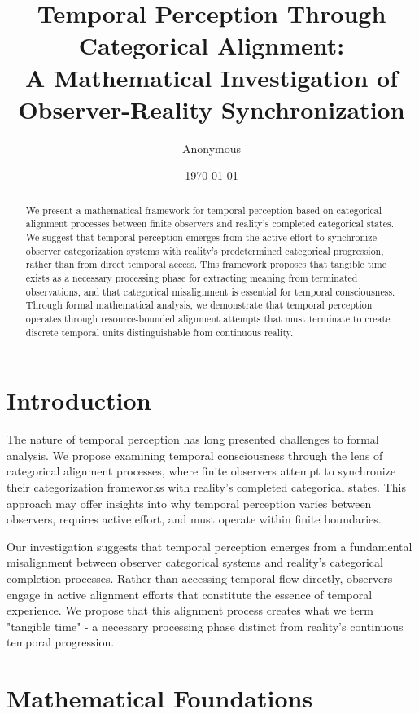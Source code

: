 \documentclass[12pt,a4paper]{article}
\title{Temporal Perception Through Categorical Alignment: \\
A Mathematical Investigation of Observer-Reality Synchronization}
\author{Anonymous}
\date{\today}
\begin{document}
\maketitle

\begin{abstract}
We present a mathematical framework for temporal perception based on categorical alignment processes between finite observers and reality's completed categorical states. We suggest that temporal perception emerges from the active effort to synchronize observer categorization systems with reality's predetermined categorical progression, rather than from direct temporal access. This framework proposes that tangible time exists as a necessary processing phase for extracting meaning from terminated observations, and that categorical misalignment is essential for temporal consciousness. Through formal mathematical analysis, we demonstrate that temporal perception operates through resource-bounded alignment attempts that must terminate to create discrete temporal units distinguishable from continuous reality.
\end{abstract}

\section{Introduction}

The nature of temporal perception has long presented challenges to formal analysis. We propose examining temporal consciousness through the lens of categorical alignment processes, where finite observers attempt to synchronize their categorization frameworks with reality's completed categorical states. This approach may offer insights into why temporal perception varies between observers, requires active effort, and must operate within finite boundaries.

Our investigation suggests that temporal perception emerges from a fundamental misalignment between observer categorical systems and reality's categorical completion processes. Rather than accessing temporal flow directly, observers engage in active alignment efforts that constitute the essence of temporal experience. We propose that this alignment process creates what we term "tangible time" - a necessary processing phase distinct from reality's continuous temporal progression.

\section{Mathematical Foundations}
\end{document}
